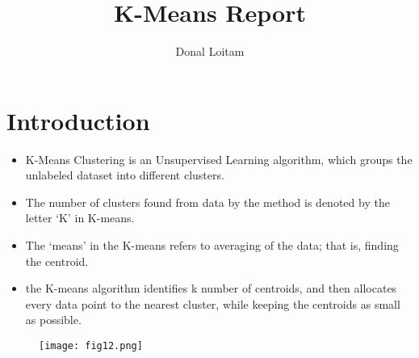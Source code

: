 \documentclass[a4paper, 11pt]{article}
\title{K-Means Report}
\author{Donal Loitam}
\begin{document}
\maketitle
\tableofcontents

\section{Introduction}
\begin{itemize}
    \item K-Means Clustering is an Unsupervised Learning algorithm, which groups the unlabeled dataset into different clusters.
    \item  The number of clusters found from data by the method is denoted by the letter ‘K’ in K-means.
    \item The ‘means’ in the K-means refers to averaging of the data; that is, finding the centroid.
    \item the K-means algorithm identifies k number of centroids, and then allocates every data point to the nearest cluster, while keeping the centroids as small as possible.
\end{itemize}
 \begin{figure}[ht!]
    \texttt{[image: fig12.png]}
    \label{fig:fig12}
  \end{figure}
\pagebreak
\end{document}
